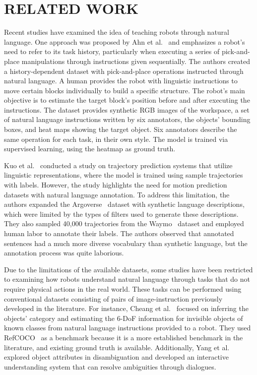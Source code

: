 \section{RELATED WORK}
Recent studies have examined the idea of teaching robots through natural language. One approach was proposed by Ahn et al.~\cite{ahn2022visually} and emphasizes a robot's need to refer to its task history, particularly when executing a series of pick-and-place manipulations through instructions given sequentially. The authors created a history-dependent dataset with pick-and-place operations instructed through natural language. A human provides the robot with linguistic instructions to move certain blocks individually to build a specific structure. The robot's main objective is to estimate the target block's position before and after executing the instructions. The dataset provides synthetic RGB images of the workspace, a set of natural language instructions written by six annotators, the objects' bounding boxes, and heat maps showing the target object. Six annotators describe the same operation for each task, in their own style. The model is trained via supervised learning, using the heatmap as ground truth.

Kuo et al.~\cite{kuo2022trajectory} conducted a study on trajectory prediction systems that utilize linguistic representations, where the model is trained using sample trajectories with labels. However, the study highlights the need for motion prediction datasets with natural language annotation. To address this limitation, the authors expanded the Argoverse~\cite{chang2019argoverse} dataset with synthetic language descriptions, which were limited by the types of filters used to generate these descriptions. They also sampled 40,000 trajectories from the Waymo~\cite{sun2020scalability} dataset and employed human labor to annotate their labels. The authors observed that annotated sentences had a much more diverse vocabulary than synthetic language, but the annotation process was quite laborious. 

Due to the limitations of the available datasets, some studies have been restricted to examining how robots understand natural language through tasks that do not require physical actions in the real world. These tasks can be performed using conventional datasets consisting of pairs of image-instruction previously developed in the literature. For instance, Cheang et al.~\cite{cheang2022learning} focused on inferring the objects' category and estimating the 6-DoF information for invisible objects of known classes from natural language instructions provided to a robot. They used RefCOCO~\cite{kazemzadeh2014referitgame} as a benchmark because it is a more established benchmark in the literature, and existing ground truth is available. Additionally, Yang et al.~\cite{yang2022interactive} explored object attributes in disambiguation and developed an interactive understanding system that can resolve ambiguities through dialogues.

